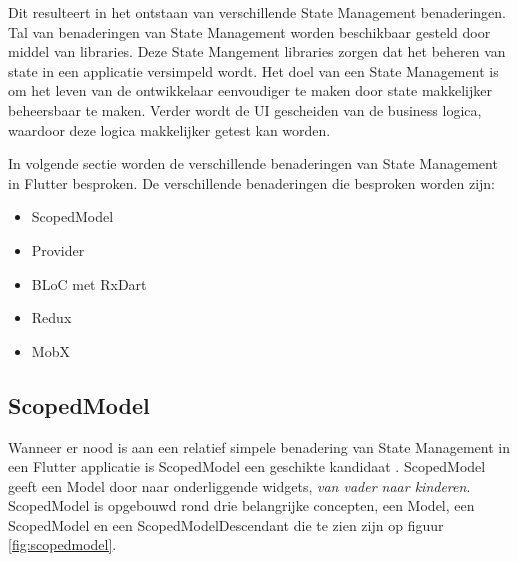 Dit resulteert in het ontstaan van verschillende State Management benaderingen. Tal van benaderingen van State Management worden beschikbaar gesteld door middel van libraries. Deze State Mangement libraries zorgen dat het beheren van state in een applicatie versimpeld wordt.
Het doel van een State Management is om het leven van de ontwikkelaar eenvoudiger te
maken door state makkelijker beheersbaar te maken. Verder wordt de UI gescheiden van
de business logica, waardoor deze logica makkelijker getest kan worden.

In volgende sectie worden de verschillende benaderingen van State Management in Flutter besproken.
De verschillende benaderingen die besproken worden zijn: 
\begin{itemize}
    \item ScopedModel
    \item Provider
    \item BLoC met RxDart
    \item Redux
    \item MobX
\end{itemize}

\subsection{ScopedModel}
Wanneer er nood is aan een relatief simpele benadering van State Management in een Flutter applicatie is ScopedModel een geschikte kandidaat \autocite{Boelens2019}. ScopedModel geeft een Model door naar onderliggende widgets, \textit{van vader naar kinderen}. ScopedModel is opgebouwd rond drie belangrijke concepten, een Model, een ScopedModel en een ScopedModelDescendant die te zien zijn op figuur \ref{fig:scopedmodel}. 

